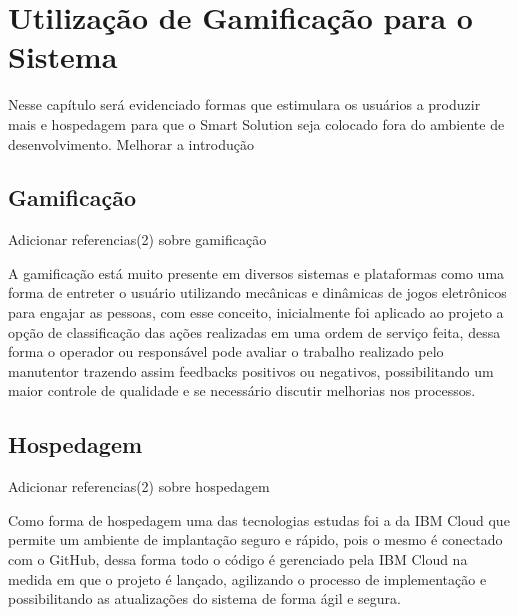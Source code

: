 \chapter{Utilização de Gamificação para o Sistema }
Nesse capítulo será evidenciado formas que estimulara os usuários a produzir mais e hospedagem para que o Smart Solution seja colocado fora do ambiente de desenvolvimento. {\color{red} Melhorar a introdução}
\section{Gamificação}

{\color{red} Adicionar referencias(2) sobre gamificação }

A gamificação está muito presente em diversos sistemas e plataformas como uma forma de entreter o usuário utilizando mecânicas e dinâmicas de jogos eletrônicos para engajar as pessoas, com esse conceito, inicialmente foi aplicado ao projeto a opção de classificação das ações realizadas em uma ordem de serviço feita, dessa forma o operador ou responsável pode avaliar o trabalho realizado pelo manutentor trazendo assim feedbacks positivos ou negativos, possibilitando um maior controle de qualidade e se necessário discutir melhorias nos processos.



\section{Hospedagem}

{\color{red} Adicionar referencias(2) sobre hospedagem }

Como forma de hospedagem uma das tecnologias estudas foi a da IBM Cloud que permite um ambiente de implantação seguro e rápido, pois o mesmo é conectado com o GitHub, dessa forma todo o código é gerenciado pela IBM Cloud na medida em que o projeto é lançado, agilizando o processo de implementação e possibilitando as atualizações do sistema de forma ágil e segura.
